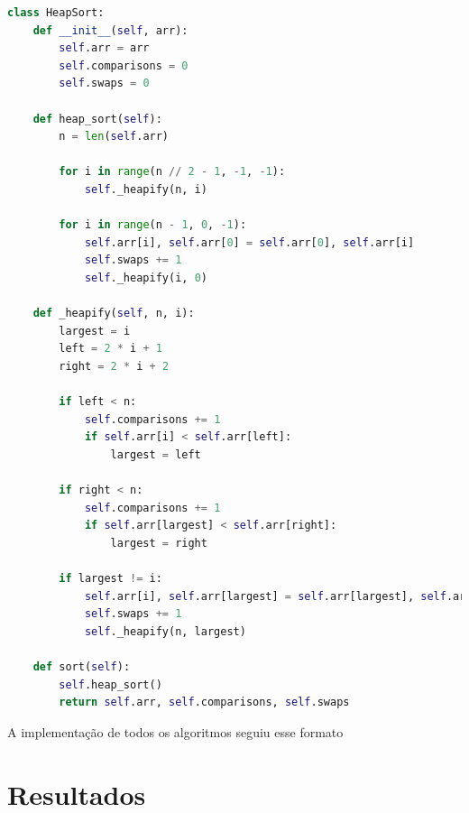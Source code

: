 \documentclass[tcc1,project]{uftex}
\begin{document}
\begin{lstlisting}[language=Python, caption=HeapSort]
class HeapSort:
    def __init__(self, arr):
        self.arr = arr
        self.comparisons = 0
        self.swaps = 0

    def heap_sort(self):
        n = len(self.arr)

        for i in range(n // 2 - 1, -1, -1):
            self._heapify(n, i)

        for i in range(n - 1, 0, -1):
            self.arr[i], self.arr[0] = self.arr[0], self.arr[i]
            self.swaps += 1
            self._heapify(i, 0)

    def _heapify(self, n, i):
        largest = i
        left = 2 * i + 1
        right = 2 * i + 2

        if left < n:
            self.comparisons += 1
            if self.arr[i] < self.arr[left]:
                largest = left

        if right < n:
            self.comparisons += 1
            if self.arr[largest] < self.arr[right]:
                largest = right

        if largest != i:
            self.arr[i], self.arr[largest] = self.arr[largest], self.arr[i]
            self.swaps += 1
            self._heapify(n, largest)

    def sort(self):
        self.heap_sort()
        return self.arr, self.comparisons, self.swaps
\end{lstlisting}

A implementação de todos os algoritmos seguiu esse formato




\lstset{style=mystyle}

\chapter{Resultados}
\end{document}
